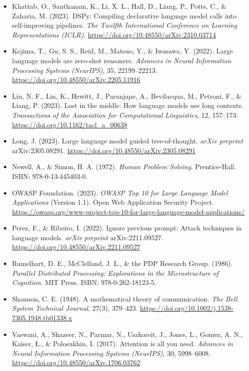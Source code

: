 \begin{itemize}[leftmargin=1.5em, label={}, itemsep=0.22ex, parsep=0pt]
    \item Khattab, O., Santhanam, K., Li, X. L., Hall, D., Liang, P., Potts, C., \& Zaharia, M. (2023). DSPy: Compiling declarative language model calls into self-improving pipelines. \textit{The Twelfth International Conference on Learning Representations (ICLR)}. \url{https://doi.org/10.48550/arXiv.2310.03714}
    \item Kojima, T., Gu, S. S., Reid, M., Matsuo, Y., \& Iwasawa, Y. (2022). Large language models are zero-shot reasoners. \textit{Advances in Neural Information Processing Systems (NeurIPS)}, 35, 22199--22213. \url{https://doi.org/10.48550/arXiv.2205.11916}
    \item Liu, N. F., Lin, K., Hewitt, J., Paranjape, A., Bevilacqua, M., Petroni, F., \& Liang, P. (2023). Lost in the middle: How language models use long contexts. \textit{Transactions of the Association for Computational Linguistics}, 12, 157--173. \url{https://doi.org/10.1162/tacl_a_00638}
    \item Long, J. (2023). Large language model guided tree-of-thought. \textit{arXiv preprint} arXiv:2305.08291. \url{https://doi.org/10.48550/arXiv.2305.08291}
    \item Newell, A., \& Simon, H. A. (1972). \textit{Human Problem Solving}. Prentice-Hall. ISBN: 978-0-13-445403-0.
    \item OWASP Foundation. (2023). \textit{OWASP Top 10 for Large Language Model Applications} (Version 1.1). Open Web Application Security Project. \url{https://owasp.org/www-project-top-10-for-large-language-model-applications/}
    \item Perez, F., \& Ribeiro, I. (2022). Ignore previous prompt: Attack techniques in language models. \textit{arXiv preprint} arXiv:2211.09527. \url{https://doi.org/10.48550/arXiv.2211.09527}
    \item Rumelhart, D. E., McClelland, J. L., \& the PDP Research Group. (1986). \textit{Parallel Distributed Processing: Explorations in the Microstructure of Cognition}. MIT Press. ISBN: 978-0-262-18123-5.
    \item Shannon, C. E. (1948). A mathematical theory of communication. \textit{The Bell System Technical Journal}, 27(3), 379--423. \url{https://doi.org/10.1002/j.1538-7305.1948.tb01338.x}
    \item Vaswani, A., Shazeer, N., Parmar, N., Uszkoreit, J., Jones, L., Gomez, A. N., Kaiser, Ł., \& Polosukhin, I. (2017). Attention is all you need. \textit{Advances in Neural Information Processing Systems (NeurIPS)}, 30, 5998--6008. \url{https://doi.org/10.48550/arXiv.1706.03762}

\end{itemize}

